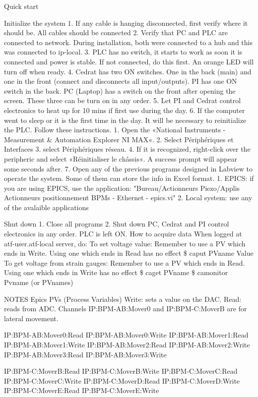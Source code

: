 \documentclass[a4paper,11pt]{book}
\begin{document}
Quick start

Initialize the system
1. If any cable is hanging disconnected, first verify where it should be. All cables should be connected
2. Verify that PC and PLC are connected to network. During installation, both were connected to a hub and this was connected to ip-local.
3. PLC has no switch, it starts to work as soon it is connected and power is stable. If not connected, do this first. An orange LED will turn off when ready.
4. Cedrat has two ON switches. One in the back (main) and one in the front (connect and disconnects all input/outputs).
PI has one ON switch in the back.
PC (Laptop) has a switch on the front after opening the screen.
These three can be turn on in any order.
5. Let PI and Cedrat control electronics to heat up for 10 mins if first use during the day.
6. If the computer went to sleep or it is the first time in the day. It will be necessary to reinitialize the PLC. Follow these instructions.
1. Open the «National Instruments - Measurement \& Automation Explorer NI MAX«.
2. Select Périphériques et Interfaces
3. select Périphériques réseau.
4. If it is recognized, right-click over the peripheric and select «Réinitialiser le châssis«. A success prompt will appear some seconds after.
7. Open any of the previous programs designed in Labview to operate the system. Some of them can store the info in Excel format.
1. EPICS: if you are using EPICS, use the application:
"Bureau/Actionneurs Piezo/Applis Actionneurs positionnement BPMs - Ethernet - epics.vi" 
2. Local system: use any of the avalaible applications

Shut down
1. Close all programs
2. Shut down PC, Cedrat and PI control electronics in any order.
PLC is left ON.
How to acquire data
When logged at atf-user.atf-local server, do:
To set voltage value:
Remember to use a PV which ends in Write.
Using one which ends in Read has no effect
\$ caput PVname Value
To get voltage from strain gauges:
Remember to use a PV which ends in Read.
Using one which ends in Write has no effect
\$ caget PVname
\$ camonitor Pvname (or PVnames)

NOTES
Epics PVs (Process Variables)
Write: sets a value on the DAC.
Read: reads from ADC.
Channels IP:BPM-AB:Mover0 and IP:BPM-C:MoverB are for lateral movement.

IP:BPM-AB:Mover0:Read
IP:BPM-AB:Mover0:Write
IP:BPM-AB:Mover1:Read
IP:BPM-AB:Mover1:Write
IP:BPM-AB:Mover2:Read
IP:BPM-AB:Mover2:Write
IP:BPM-AB:Mover3:Read
IP:BPM-AB:Mover3:Write

IP:BPM-C:MoverB:Read
IP:BPM-C:MoverB:Write
IP:BPM-C:MoverC:Read
IP:BPM-C:MoverC:Write
IP:BPM-C:MoverD:Read
IP:BPM-C:MoverD:Write
IP:BPM-C:MoverE:Read
IP:BPM-C:MoverE:Write
\end{document}
